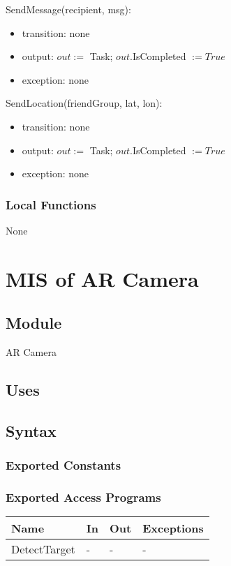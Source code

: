 \documentclass[12pt, titlepage]{article}
\begin{document}
\begin{itemize}
\noindent SendMessage(recipient, msg):
\begin{itemize}
\item transition: none
\item output: $out :=$ Task; $out$.IsCompleted $:= True$
\item exception: none
\end{itemize}

\noindent SendLocation(friendGroup, lat, lon):
\begin{itemize}
\item transition: none
\item output: $out :=$ Task; $out$.IsCompleted $:= True$
\item exception: none
\end{itemize}

\subsubsection{Local Functions}

None

\newpage

\section{MIS of AR Camera} \label{mARCamera}

\subsection{Module}

AR Camera

\subsection{Uses}

\subsection{Syntax}

\subsubsection{Exported Constants}

\subsubsection{Exported Access Programs}

\begin{center}
\begin{tabular}{p{2cm} p{4cm} p{4cm} p{2cm}}
\hline
\textbf{Name} & \textbf{In} & \textbf{Out} & \textbf{Exceptions} \\
\hline
DetectTarget & - & - & - \\


\end{tabular}
\end{center}
\end{itemize}
\end{document}
